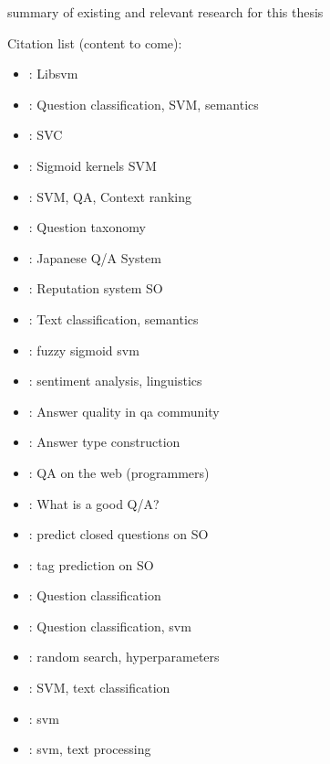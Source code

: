 \label{chap:chapter2}
summary of existing and relevant research for this thesis

Citation list (content to come):
\begin{itemize}
	\item \cite{ChangLin2011}: Libsvm
	\item \cite{XuZhouWang2012}: Question classification, SVM, semantics
	\item \cite{HsuChangLinEtAl2003}: SVC
	\item \cite{LinLin2003}: Sigmoid kernels SVM
	\item \cite{YenWuYangEtAl2013}: SVM, QA, Context ranking
	\item \cite{NielsenBuckinghamKnollEtAl2008}: Question taxonomy
	\item \cite{Isozaki2005}: Japanese Q/A System
	\item \cite{Movshovitz-AttiasMovshovitz-AttiasSteenkisteEtAl2013}: Reputation system SO
	\item \cite{BloehdornHotho2004}: Text classification, semantics
	\item \cite{HanDingLing-Feng2006}: fuzzy sigmoid svm
	\item \cite{ZhangWuLan2015}: sentiment analysis, linguistics
	\item \cite{ShahPomerantz2010}: Answer quality in qa community
	\item \cite{TobaAdrianiManurung2011}: Answer type construction
	\item \cite{TreudeBarzilayStorey2011}: QA on the web (programmers)
	\item \cite{SlowiaczekKlaymanShermanEtAl1992}: What is a good Q/A?
	\item \cite{LezinaKuznetsov2013}: predict closed questions on SO
	\item \cite{StanleyByrne2013}: tag prediction on SO
	\item \cite{HuangThintQin2008}: Question classification
	\item \cite{ZhangLee2003}: Question classification, svm
	\item \cite{BergstraBengio2012}: random search, hyperparameters
	\item \cite{TongKoller2002}: SVM, text classification
	\item \cite{HearstDumaisOsmanEtAl1998}: svm
	\item \cite{Kaestner2013}: svm, text processing

\end{itemize}
